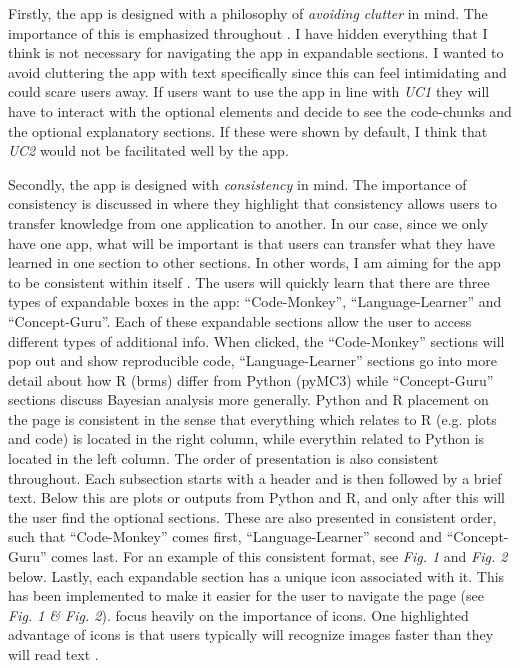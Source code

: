 \documentclass[12pt]{article}
\begin{document}
\vspace{5mm}

Firstly, the app is designed with a philosophy of \emph{avoiding clutter} in mind.
The importance of this is emphasized throughout \textcite{mills1992macintosh}.
I have hidden everything that I think is not necessary for navigating the app
in expandable sections. I wanted to avoid cluttering the
app with text specifically since this can feel intimidating and could scare users away.
If users want to use the app in line with \emph{UC1} they will have to interact with the optional
elements and decide to see the code-chunks and the optional explanatory sections.
If these were shown by default, I think that \emph{UC2} would not be facilitated well by the app.

\vspace{5mm}

Secondly, the app is designed with \emph{consistency} in mind.
The importance of consistency is discussed in
\textcite[7]{mills1992macintosh}
where they highlight that consistency allows users to transfer knowledge from one
application to another. In our case, since we only have one app, what will be important is
that users can transfer what they have learned in one section to other sections.
In other words, I am aiming for the app to be consistent within itself
\autocite[8]{mills1992macintosh}.
The users will quickly learn that there are three types of expandable boxes in the app:
“Code-Monkey”, “Language-Learner” and “Concept-Guru”. Each of these expandable sections
allow the user to access different types of additional info. When clicked, the “Code-Monkey”
sections will pop out and show reproducible code, “Language-Learner” sections go into more detail
about how R (brms) differ from Python (pyMC3) while “Concept-Guru” sections discuss Bayesian analysis
more generally. Python and R placement on the page is consistent in the sense
that everything which relates to R (e.g. plots and code) is located in the
right column, while everythin related to Python is located in the left column.
The order of presentation is also consistent throughout.
Each subsection starts with a header and is then followed by a brief text.
Below this are plots or outputs from Python and R, and only after this will the user find
the optional sections. These are also presented in consistent order, such that “Code-Monkey” comes first,
“Language-Learner” second and “Concept-Guru” comes last. For an example of this
consistent format, see \emph{Fig. 1} and \emph{Fig. 2} below.
Lastly, each expandable section
has a unique icon associated with it. This has been implemented to make it easier for the
user to navigate the page (see \emph{Fig. 1 \& Fig. 2}). \textcite[223-255]{mills1992macintosh} focus
heavily on the importance of icons. One highlighted advantage of icons is that users typically
will recognize images faster than they will read text
\autocite[244]{mills1992macintosh}.
\end{document}
